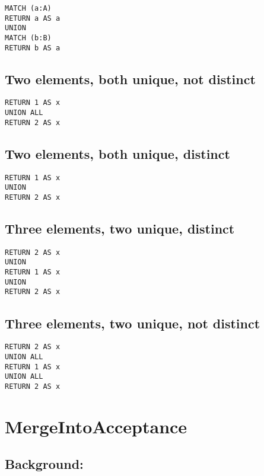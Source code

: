 \begin{lstlisting}
MATCH (a:A)
RETURN a AS a
UNION
MATCH (b:B)
RETURN b AS a
\end{lstlisting}

\subsection{Two elements, both unique, not distinct}

\begin{lstlisting}
RETURN 1 AS x
UNION ALL
RETURN 2 AS x
\end{lstlisting}

\subsection{Two elements, both unique, distinct}

\begin{lstlisting}
RETURN 1 AS x
UNION
RETURN 2 AS x
\end{lstlisting}

\subsection{Three elements, two unique, distinct}

\begin{lstlisting}
RETURN 2 AS x
UNION
RETURN 1 AS x
UNION
RETURN 2 AS x
\end{lstlisting}

\subsection{Three elements, two unique, not distinct}

\begin{lstlisting}
RETURN 2 AS x
UNION ALL
RETURN 1 AS x
UNION ALL
RETURN 2 AS x
\end{lstlisting}
\section{MergeIntoAcceptance}


\subsection{Background:}

\begin{lstlisting}
\end{lstlisting}

